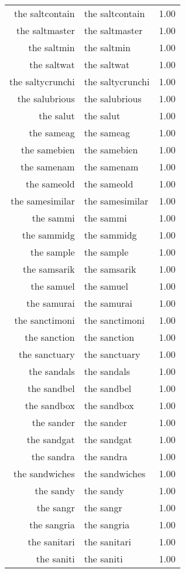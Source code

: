 \begin{table}[ht]
\begin{tabular}{rlr}
  the saltcontain & the saltcontain & 1.00 \\ 
  the saltmaster & the saltmaster & 1.00 \\ 
  the saltmin & the saltmin & 1.00 \\ 
  the saltwat & the saltwat & 1.00 \\ 
  the saltycrunchi & the saltycrunchi & 1.00 \\ 
  the salubrious & the salubrious & 1.00 \\ 
  the salut & the salut & 1.00 \\ 
  the sameag & the sameag & 1.00 \\ 
  the samebien & the samebien & 1.00 \\ 
  the samenam & the samenam & 1.00 \\ 
  the sameold & the sameold & 1.00 \\ 
  the samesimilar & the samesimilar & 1.00 \\ 
  the sammi & the sammi & 1.00 \\ 
  the sammidg & the sammidg & 1.00 \\ 
  the sample & the sample & 1.00 \\ 
  the samsarik & the samsarik & 1.00 \\ 
  the samuel & the samuel & 1.00 \\ 
  the samurai & the samurai & 1.00 \\ 
  the sanctimoni & the sanctimoni & 1.00 \\ 
  the sanction & the sanction & 1.00 \\ 
  the sanctuary & the sanctuary & 1.00 \\ 
  the sandals & the sandals & 1.00 \\ 
  the sandbel & the sandbel & 1.00 \\ 
  the sandbox & the sandbox & 1.00 \\ 
  the sander & the sander & 1.00 \\ 
  the sandgat & the sandgat & 1.00 \\ 
  the sandra & the sandra & 1.00 \\ 
  the sandwiches & the sandwiches & 1.00 \\ 
  the sandy & the sandy & 1.00 \\ 
  the sangr & the sangr & 1.00 \\ 
  the sangria & the sangria & 1.00 \\ 
  the sanitari & the sanitari & 1.00 \\ 
  the saniti & the saniti & 1.00 \\ 

\end{tabular}
\end{table}
